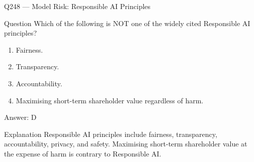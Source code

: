 \documentclass[aspectratio=169,8pt]{beamer}
\begin{document}
																																		\begin{frame}{Q248 --- Model Risk: Responsible AI Principles}
																																			\begin{block}{Question}
																																				Which of the following is NOT one of the widely cited Responsible AI principles?
																																				\begin{enumerate}
																																					\item Fairness.
																																					\item Transparency.
																																					\item Accountability.
																																					\item Maximising short-term shareholder value regardless of harm.
																																				\end{enumerate}  \end{block}
																																				\begin{exampleblock}{Answer: D}\end{exampleblock}
																																				\begin{block}{Explanation}
																																					Responsible AI principles include fairness, transparency, accountability, privacy, and safety. Maximising short-term shareholder value at the expense of harm is contrary to Responsible AI.
																																				\end{block}
																																			\end{frame}
																																			
\end{document}
